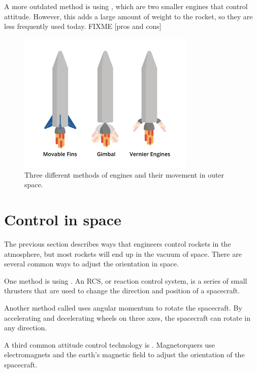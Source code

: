 	A more outdated method is using , which are two smaller engines that control attitude. However, this adds a large amount of weight to the rocket, so they are less frequently used today. FIXME [pros and cons]

\begin{figure}[htbp]
    \centering
	\includegraphics[width=0.75\textwidth]{control.png}
    \caption{Three different methods of engines and their movement in outer space.}
    \label{fig:atmoscontrol}
\end{figure}


\section{Control in space}
The previous section describes ways that engineers control rockets in the atmosphere, but most rockets will end up in the vacuum of space. There are several common ways to adjust the orientation in space.

	One method is using . An RCS, or reaction control system, is a series of small thrusters that are used to change the direction and position of a spacecraft. 

	Another method called  uses angular momentum to rotate the spacecraft. By accelerating and decelerating wheels on three axes, the spacecraft can rotate in any direction.

	A third common attitude control technology is . Magnetorquers use electromagnets and the earth's magnetic field to adjust the orientation of the spacecraft. 
	
